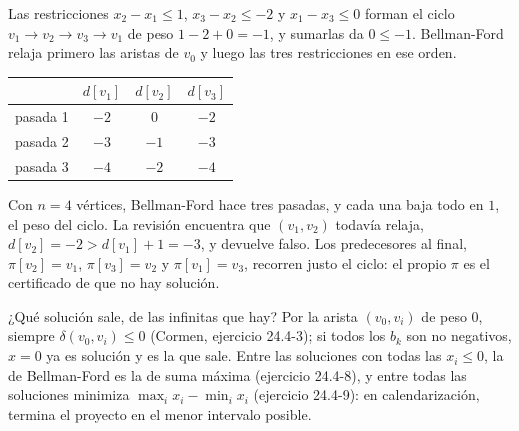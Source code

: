 \documentclass[11pt,letterpaper]{article}
\begin{document}
\begin{ejemplo}
  \label{ej:restricciones-sin-solucion}
  Las restricciones $x_2 - x_1 \le 1$, $x_3 - x_2 \le -2$ y
  $x_1 - x_3 \le 0$ forman el ciclo $v_1 \to v_2 \to v_3 \to v_1$ de
  peso $1 - 2 + 0 = -1$, y sumarlas da $0 \le -1$. Bellman-Ford
  relaja primero las aristas de $v_0$ y luego las tres restricciones
  en ese orden.
  \begin{center}
  \hspace{1cm}
  \small
  \begin{tabular}{lccc}
    \toprule
    & $d[v_1]$ & $d[v_2]$ & $d[v_3]$ \\
    \midrule
    pasada 1 & $-2$ & $0$ & $-2$ \\
    pasada 2 & $-3$ & $-1$ & $-3$ \\
    pasada 3 & $-4$ & $-2$ & $-4$ \\
    \bottomrule
  \end{tabular}
  \end{center}
  Con $n = 4$ vértices, Bellman-Ford hace tres pasadas, y cada una
  baja todo en $1$, el peso del ciclo. La revisión encuentra que
  $(v_1, v_2)$ todavía relaja, $d[v_2] = -2 > d[v_1] + 1 = -3$, y
  devuelve falso. Los predecesores al final, $\pi[v_2] = v_1$,
  $\pi[v_3] = v_2$ y $\pi[v_1] = v_3$, recorren justo el ciclo: el
  propio $\pi$ es el certificado de que no hay solución.
\end{ejemplo}

¿Qué solución sale, de las infinitas que hay? Por la arista
$(v_0, v_i)$ de peso $0$, siempre $\delta(v_0, v_i) \le 0$ (Cormen,
ejercicio 24.4-3); si todos los $b_k$ son no negativos, $x = 0$ ya es
solución y es la que sale. Entre las soluciones con todas las
$x_i \le 0$, la de Bellman-Ford es la de suma máxima (ejercicio
24.4-8), y entre todas las soluciones minimiza
$\max_i x_i - \min_i x_i$ (ejercicio 24.4-9): en calendarización,
termina el proyecto en el menor intervalo posible.
\end{document}
